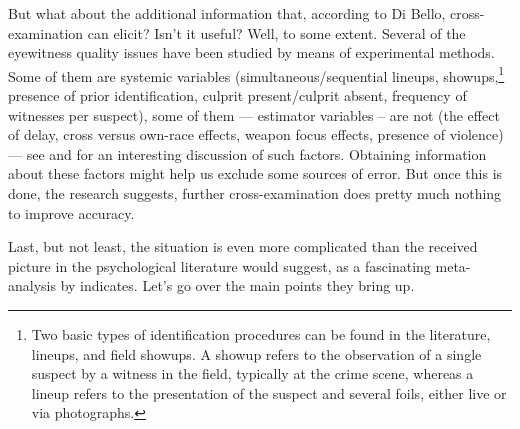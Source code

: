\documentclass{article}
\begin{document}
But what about the additional information that, according to Di Bello, cross-examination can elicit? Isn't it useful? Well, to some extent. Several of the eyewitness quality issues  have been studied by means of experimental methods.
Some of them are systemic variables (simultaneous/sequential lineups, showups,\footnote{Two basic types of identification procedures can be found in the literature, lineups, and field showups. A showup refers to the observation of a single suspect by a witness in the field, typically at the crime scene, whereas a lineup refers to the presentation of the suspect and several foils, either live or via photographs.} presence of prior identification, culprit present/culprit absent, frequency of witnesses per suspect), some of them --- estimator variables -- are not  (the effect of delay, cross versus own-race effects, weapon focus effects, presence of violence) --- see \citep{behrman2001EyewitnessIdentificationActual} and \citep{wells2003EyewitnessTestimony} for an interesting discussion of such factors. Obtaining information about these factors might help us exclude some sources of  error. But once this is done, the research suggests, further cross-examination does pretty much nothing to improve accuracy. 

Last, but not least, the situation is even more complicated than the received picture  in the psychological literature would suggest, as a fascinating meta-analysis by \citet{wixted2017RelationshipEyewitnessConfidence} indicates. Let's go over the main points they bring up. 
\end{document}
